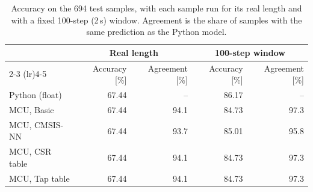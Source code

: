 \begin{table}[htbp]
\centering
\caption{Accuracy on the 694 test samples, with each sample run for its real length and with a fixed
100-step (2\,s) window. Agreement is the share of samples with the same prediction as the Python model.}
\label{tab:accuracy}
\begin{tabular}{lrrrr}
\toprule
 & \multicolumn{2}{c}{Real length} & \multicolumn{2}{c}{100-step window} \\
\cmidrule(lr){2-3} \cmidrule(lr){4-5}
 & Accuracy [\%] & Agreement [\%] & Accuracy [\%] & Agreement [\%] \\
\midrule
Python (float) & 67.44 & -- & 86.17 & -- \\
MCU, Basic & 67.44 & 94.1 & 84.73 & 97.3 \\
MCU, CMSIS-NN & 67.44 & 93.7 & 85.01 & 95.8 \\
MCU, CSR table & 67.44 & 94.1 & 84.73 & 97.3 \\
MCU, Tap table & 67.44 & 94.1 & 84.73 & 97.3 \\
\bottomrule
\end{tabular}
\end{table}
